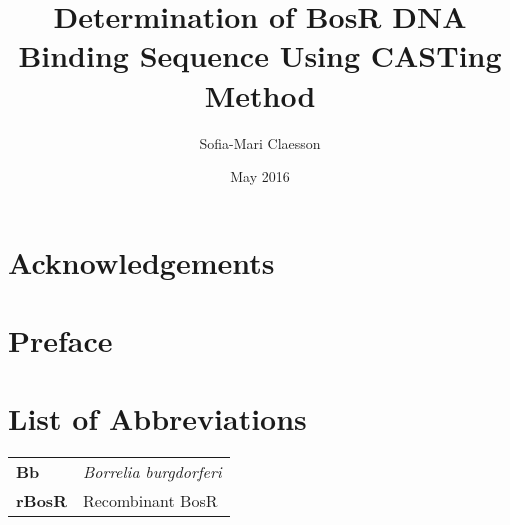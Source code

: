 \documentclass[12pt,twoside]{reedthesis}
\title{Determination of BosR DNA Binding Sequence Using CASTing Method}
\author{Sofia-Mari Claesson}
\date{May 2016}
\begin{document}
  \maketitle
  \frontmatter %
  \pagestyle{empty} %

    \chapter*{Acknowledgements}

    \chapter*{Preface}
	
	

    \chapter*{List of Abbreviations}

	\begin{table}[h]
	\centering %
	\begin{tabular}{ll}
		\textbf{Bb}  	&  \textit{Borrelia burgdorferi} \\
		\textbf{rBosR}  	&  Recombinant BosR\\
	\end{tabular}
	\end{table}
	
\end{document}
